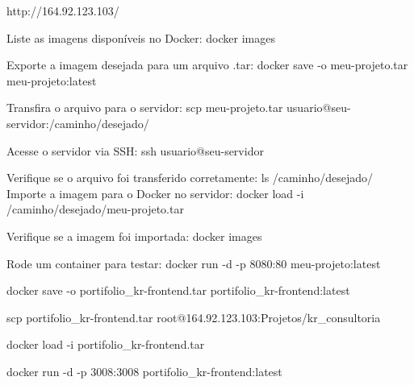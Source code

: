 
http://164.92.123.103/

Liste as imagens disponíveis no Docker:
docker images

Exporte a imagem desejada para um arquivo .tar:
docker save -o meu-projeto.tar meu-projeto:latest

Transfira o arquivo para o servidor:
scp meu-projeto.tar usuario@seu-servidor:/caminho/desejado/

Acesse o servidor via SSH:
ssh usuario@seu-servidor

Verifique se o arquivo foi transferido corretamente:
ls /caminho/desejado/
Importe a imagem para o Docker no servidor:
docker load -i /caminho/desejado/meu-projeto.tar

Verifique se a imagem foi importada:
docker images

Rode um container para testar:
docker run -d -p 8080:80 meu-projeto:latest


docker save -o portifolio_kr-frontend.tar portifolio_kr-frontend:latest

scp portifolio_kr-frontend.tar root@164.92.123.103:Projetos/kr_consultoria


docker load -i portifolio_kr-frontend.tar

docker run -d -p 3008:3008 portifolio_kr-frontend:latest